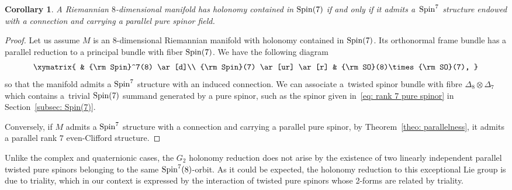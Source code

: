 \documentclass[pdftex]{sigma}
\numberwithin{equation}{section}
\newtheorem{Corollary}[Theorem]{Corollary}
\begin{document}
\begin{Corollary} A Riemannian $8$-dimensional manifold has holonomy contained in ${\rm Spin}(7)$ if and only if it admits a~${\rm Spin}^7$ structure endowed with a connection and carrying a parallel pure spinor field.
\end{Corollary}
\begin{proof} Let us assume $M$ is an $8$-dimensional Riemannian manifold with holonomy contained in ${\rm Spin}(7)$. Its orthonormal frame bundle has a parallel reduction to a principal bundle with fiber ${\rm Spin}(7)$. We have the following diagram
\begin{gather*}
\xymatrix{
 & {\rm Spin}^7(8) \ar[d]\\
{\rm Spin}(7) \ar[ur] \ar[r] & {\rm SO}(8)\times {\rm SO}(7),
}
\end{gather*}
so that the manifold admits a ${\rm Spin}^7$ structure with an induced connection. We can associate a~twisted spinor bundle with fibre $\Delta_{8}\otimes \Delta_7$ which contains a~trivial ${\rm Spin}(7)$ summand generated by a pure spinor, such as the spinor given in~\eqref{eq: rank 7 pure spinor} in Section~\ref{subsec: Spin(7)}.

Conversely, if $M$ admits a ${\rm Spin}^7$ structure with a connection and carrying a parallel pure spinor, by Theorem~\ref{theo: parallelness}, it admits a parallel rank $7$ even-Clifford structure.
\end{proof}

Unlike the complex and quaternionic cases, the $G_2$ holonomy reduction does not arise by the existence of two linearly independent parallel twisted pure spinors belonging to the same ${\rm Spin}^7(8)$-orbit. As it could be expected, the holonomy reduction to this exceptional Lie group is due to triality, which in our context is
expressed by the interaction of twisted pure spinors whose 2-forms are related by triality.
\end{document}
